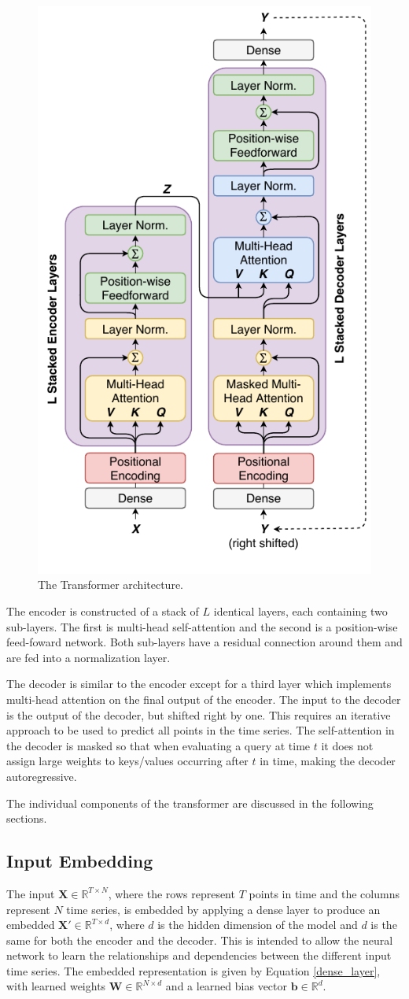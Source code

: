 \begin{figure}[htbp]
	\centerline{\includegraphics[trim=0 0cm 0 0, width=.4\textwidth]{images/transformer.pdf}}
	\caption{The Transformer architecture.}
	\label{fig:transformer}
\end{figure}

The encoder is constructed of a stack of $L$ identical layers, each containing two sub-layers.
The first is multi-head self-attention and the second is a position-wise feed-foward network.
Both sub-layers have a residual connection around them and are fed into a normalization layer.

The decoder is similar to the encoder except for a third layer which implements multi-head attention on the final output of the encoder.
The input to the decoder is the output of the decoder, but shifted right by one.
This requires an iterative approach to be used to predict all points in the time series.
The self-attention in the decoder is masked so that when evaluating a query at time $t$ it does not assign large weights to keys/values occurring after $t$ in time, making the decoder autoregressive.

The individual components of the transformer are discussed in the following sections.

\subsection{Input Embedding}
The input $\boldsymbol{X} \in \mathbb{R}^{T \times N}$, where the rows represent $T$ points in time and the columns represent $N$ time series, is embedded by applying a dense layer to produce an embedded $\boldsymbol{X'} \in \mathbb{R}^{T \times d}$, where $d$ is the hidden dimension of the model and $d$ is the same for both the encoder and the decoder.
This is intended to allow the neural network to learn the relationships and dependencies between the different input time series.
The embedded representation is given by Equation \ref{dense_layer}, with learned weights $\boldsymbol{W} \in \mathbb{R}^{N \times d}$ and a learned bias vector $\boldsymbol{b} \in \mathbb{R}^{d}$.

